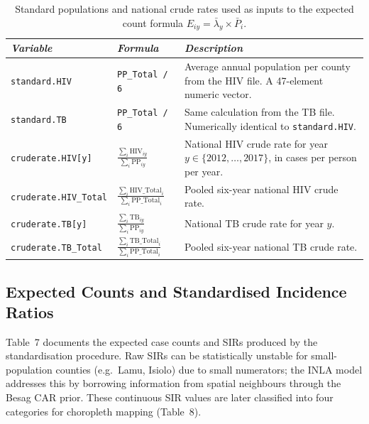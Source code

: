 \documentclass[11pt,a4paper]{article}
\newcommand{\code}[1]{\texttt{\small #1}}
\begin{document}
\begin{table}[H]
\caption{Standard populations and national crude rates used as inputs to the expected count formula $E_{iy} = \bar{\lambda}_y \times \bar{P}_i$.}
\renewcommand{\arraystretch}{1.10}
\scriptsize\begin{tabularx}{\textwidth}{@{}L{3.8cm}L{5.2cm}X@{}}
\toprule
\textit{Variable} & \textit{Formula} & \textit{Description}\\
\midrule
\code{standard.HIV}
  & \code{PP\_Total\,/\,6}
  & Average annual population per county from the HIV file. A 47-element numeric vector.\\
\code{standard.TB}
  & \code{PP\_Total\,/\,6}
  & Same calculation from the TB file. Numerically identical to \code{standard.HIV}.\\[5pt]
\code{cruderate.HIV[y]}
  & $\displaystyle\frac{\sum_i\mathrm{HIV}_{iy}}{\sum_i\mathrm{PP}_{iy}}$
  & National HIV crude rate for year $y\in\{2012,\ldots,2017\}$, in cases per person per year.\\[8pt]
\code{cruderate.HIV\_Total}
  & $\displaystyle\frac{\sum_i\mathrm{HIV\_Total}_i}{\sum_i\mathrm{PP\_Total}_i}$
  & Pooled six-year national HIV crude rate.\\[8pt]
\code{cruderate.TB[y]}
  & $\displaystyle\frac{\sum_i\mathrm{TB}_{iy}}{\sum_i\mathrm{PP}_{iy}}$
  & National TB crude rate for year $y$.\\[8pt]
\code{cruderate.TB\_Total}
  & $\displaystyle\frac{\sum_i\mathrm{TB\_Total}_i}{\sum_i\mathrm{PP\_Total}_i}$
  & Pooled six-year national TB crude rate.\\
\bottomrule
\end{tabularx}
\renewcommand{\arraystretch}{1.10}
\end{table}

\subsection{Expected Counts and Standardised Incidence Ratios}

Table~7 documents the expected case counts and SIRs produced by the
standardisation procedure. Raw SIRs can be statistically unstable for
small-population counties (e.g.\ Lamu, Isiolo) due to small numerators;
the INLA model addresses this by borrowing information from spatial
neighbours through the Besag CAR prior. These continuous SIR values are
later classified into four categories for choropleth mapping (Table~8).
\end{document}
